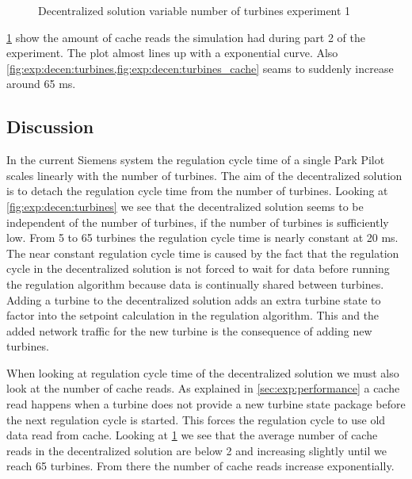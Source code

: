 \begin{figure}[h!]
	\centering
	
	\caption{Decentralized solution variable number of turbines experiment 1}
	\label{fig:exp:decen:turbines_cache}
\end{figure}


\cref{fig:exp:decen:turbines_cache} show the amount of cache reads the simulation had during part 2 of the experiment.
The plot almost lines up with a exponential curve. Also \cref{fig:exp:decen:turbines,fig:exp:decen:turbines_cache} seams to suddenly increase around 65 ms.

\subsection{Discussion}
\label{sec:disc:turbinesVScycletime}
In the current Siemens system the regulation cycle time of a single Park Pilot scales linearly with the number of turbines.
The aim of the decentralized solution is to detach the regulation cycle time from the number of turbines. 
Looking at \cref{fig:exp:decen:turbines} we see that the decentralized solution seems to be independent of the number of turbines, if the number of turbines is sufficiently low.
From 5 to 65 turbines the regulation cycle time is nearly constant at 20 ms.
The near constant regulation cycle time is caused by the fact that the regulation cycle in the decentralized solution is not forced to wait for data before running the regulation algorithm because data is continually shared between turbines. Adding a turbine to the decentralized solution adds an extra turbine state to factor into the setpoint calculation in the regulation algorithm. This and the added network traffic for the new turbine is the consequence of adding new turbines.

When looking at regulation cycle time of the decentralized solution we must also look at the number of cache reads.
As explained in \cref{sec:exp:performance} a cache read happens when a turbine does not provide a new turbine state package before the next regulation cycle is started.
This forces the regulation cycle to use old data read from cache.
Looking at \cref{fig:exp:decen:turbines_cache} we see that the average number of cache reads in the decentralized solution are below 2 and increasing slightly until we reach 65 turbines. From there the number of cache reads increase exponentially.

